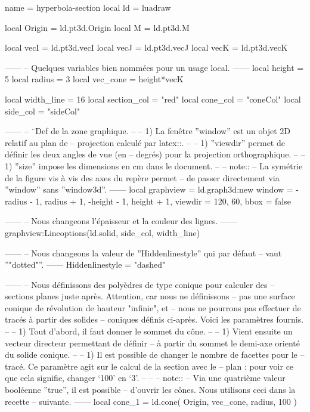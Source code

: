 \documentclass{standalone}
\begin{document}
\begin{luadraw*}{name = hyperbola-section}
local ld = luadraw

local Origin = ld.pt3d.Origin
local M      = ld.pt3d.M

local vecI = ld.pt3d.vecI
local vecJ = ld.pt3d.vecJ
local vecK = ld.pt3d.vecK

------
-- Quelques variables bien nommées pour un usage local.
------
local height   =  5
local radius   =  3
local vec_cone = height*vecK

local width_line  =  16
local section_col = "red"
local cone_col    = "coneCol"
local side_col    = "sideCol"

------
-- ¨Def de la zone graphique.
--
--     1) La fenêtre ''window'' est un objet 2D relatif au plan de
--     projection calculé par latex::\luadraw.
--
--     1) ''viewdir'' permet de définir les deux angles de vue (en
--     degrés) pour la projection orthographique.
--
--     1) ''size'' impose les dimensions en cm dans le document.
--
-- note::
--     La symétrie de la figure vis à vis des axes du repère permet
--     de passer directement via ''window'' sans ''window3d''.
------
local graphview = ld.graph3d:new{
  window  = {-radius - 1, radius + 1, -height - 1, height + 1},
  viewdir = {120, 60},
  bbox    = false
}

------
-- Nous changeons l'épaisseur et la couleur des lignes.
------
graphview:Lineoptions(ld.solid, side_col, width_line)

------
-- Nous changeons la valeur de ''Hiddenlinestyle'' qui par défaut
-- vaut ''"dotted"''.
------
Hiddenlinestyle = "dashed"

------
-- Nous définissons des polyèdres de type conique pour calculer des
-- sections planes juste après. Attention, car nous ne définissons
-- pas une surface conique de révolution de hauteur "infinie", et
-- nous ne pourrons pas effectuer de tracés à partir des solides
-- coniques définis ci-après. Voici les paramètres fournis.
--
--     1) Tout d'abord, il faut donner le sommet du cône.
--
--     1) Vient ensuite un vecteur directeur permettant de définir
--     à partir du sommet le demi-axe orienté du solide conique.
--
--     1) Il est possible de changer le nombre de facettes pour le
--     tracé. Ce paramètre agit sur le calcul de la section avec le
--     plan : pour voir ce que cela signifie, changer `100' en `3'.
--
--
-- note::
--     Via une quatrième valeur booléenne ''true'', il est possible
--     d'ouvrir les cônes. Nous utilisons ceci dans la recette
--     suivante.
------
local cone_1 = ld.cone(
  Origin, vec_cone, radius,
  100
)


\end{luadraw*}
\end{document}
